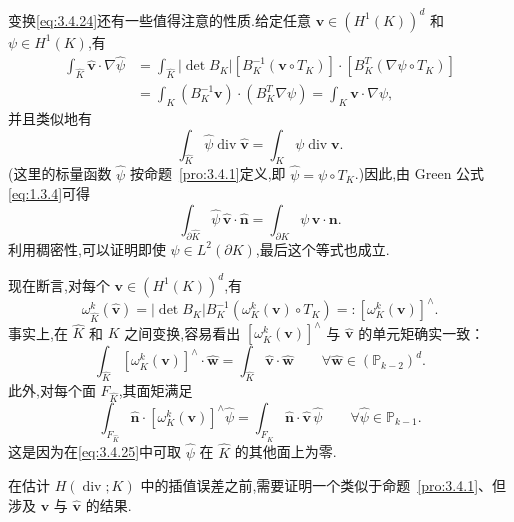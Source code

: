 变换\eqref{eq:3.4.24}还有一些值得注意的性质.给定任意 \(\boldsymbol{v}\in(H^1(K))^d\) 和 \(\psi\in H^1(K)\),有
\[
  \begin{aligned}
    \int_{\widehat K}\widehat{\boldsymbol{v}}\cdot\nabla\widehat\psi
    &=\int_{\widehat K}|\det B_K|
          [B_K^{-1}(\boldsymbol{v}\circ T_K)]\cdot[B_K^T(\nabla\psi\circ T_K)]\\
    &=\int_K(B_K^{-1}\boldsymbol{v})\cdot(B_K^T\nabla\psi)
      =\int_K\boldsymbol{v}\cdot\nabla\psi,
  \end{aligned}
\]
并且类似地有
\[
  \int_{\widehat K}\widehat\psi\operatorname{div}\widehat{\boldsymbol{v}}
  =\int_K\psi\operatorname{div}\boldsymbol{v}.
\]
(这里的标量函数 \(\widehat\psi\) 按命题~\ref{pro:3.4.1}定义,即 \(\widehat\psi=\psi\circ T_K\).)因此,由 Green 公式\eqref{eq:1.3.4}可得
\begin{equation}\label{eq:3.4.25}
  \int_{\partial\widehat K}\widehat\psi\,\widehat{\boldsymbol{v}}\cdot\widehat{\boldsymbol{n}}
  =\int_{\partial K}\psi\,\boldsymbol{v}\cdot\boldsymbol{n}.
\end{equation}
利用稠密性,可以证明即使 \(\psi\in L^2(\partial K)\),最后这个等式也成立.

现在断言,对每个 \(\boldsymbol{v}\in(H^1(K))^d\),有
\begin{equation}\label{eq:3.4.26}
  \omega_{\widehat K}^k(\widehat{\boldsymbol{v}})
   =|\det B_K|B_K^{-1}(\omega_K^k(\boldsymbol{v})\circ T_K)
   =:[\omega_K^k(\boldsymbol{v})]^\wedge.
\end{equation}
事实上,在 \(\widehat K\) 和 \(K\) 之间变换,容易看出 \([\omega_K^k(\boldsymbol{v})]^\wedge\) 与 \(\widehat{\boldsymbol{v}}\) 的单元矩确实一致：
\[
  \int_{\widehat K}[\omega_K^k(\boldsymbol{v})]^\wedge\cdot\widehat{\boldsymbol{w}}
    =\int_{\widehat K}\widehat{\boldsymbol{v}}\cdot\widehat{\boldsymbol{w}}
    \qquad\forall\widehat{\boldsymbol{w}}\in(\mathbb P_{k-2})^d.
\]
此外,对每个面 \(F_{\widehat K}\),其面矩满足
\[
  \int_{F_{\widehat K}}\widehat{\boldsymbol{n}}\cdot[\omega_K^k(\boldsymbol{v})]^\wedge\widehat\psi
   =\int_{F_{\widehat K}}\widehat{\boldsymbol{n}}\cdot\widehat{\boldsymbol{v}}\,\widehat\psi
   \qquad\forall\widehat\psi\in\mathbb P_{k-1}.
\]
这是因为在\eqref{eq:3.4.25}中可取 \(\widehat\psi\) 在 \(\widehat K\) 的其他面上为零.

在估计 \(H(\operatorname{div};K)\) 中的插值误差之前,需要证明一个类似于命题~\ref{pro:3.4.1}、但涉及 \(\boldsymbol{v}\) 与 \(\widehat{\boldsymbol{v}}\) 的结果.

